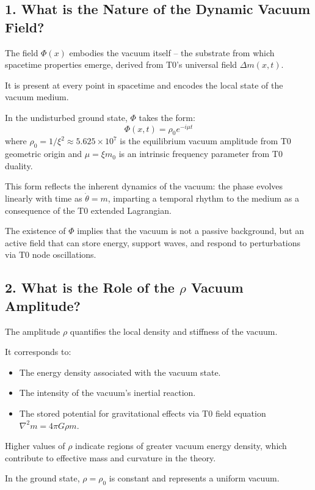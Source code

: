 \documentclass[12pt,a4paper]{article}
\begin{document}
	\subsection{1. What is the Nature of the Dynamic Vacuum Field?}
	
	The field $\Phi(x)$ embodies the vacuum itself – the substrate from which spacetime properties emerge, derived from T0's universal field $\Delta m(x,t)$.
	
	It is present at every point in spacetime and encodes the local state of the vacuum medium.
	
	In the undisturbed ground state, $\Phi$ takes the form:
	\[
	\Phi(x, t)= \rho_0 e^{-i\mu t}
	\]
	where $\rho_0 = 1/\xi^2 \approx 5.625 \times 10^7$ is the equilibrium vacuum amplitude from T0 geometric origin and $\mu = \xi m_0$ is an intrinsic frequency parameter from T0 duality.
	
	This form reflects the inherent dynamics of the vacuum: the phase evolves linearly with time as $\dot{\theta} = m$, imparting a temporal rhythm to the medium as a consequence of the T0 extended Lagrangian.
	
	The existence of $\Phi$ implies that the vacuum is not a passive background, but an active field that can store energy, support waves, and respond to perturbations via T0 node oscillations.
	
	\subsection{2. What is the Role of the $\rho$ Vacuum Amplitude?}
	
	The amplitude $\rho$ quantifies the local density and stiffness of the vacuum.
	
	It corresponds to:
	\begin{itemize}
		\item The energy density associated with the vacuum state.
		\item The intensity of the vacuum's inertial reaction.
		\item The stored potential for gravitational effects via T0 field equation $\nabla^2 m = 4\pi G \rho m$.
	\end{itemize}
	
	Higher values of $\rho$ indicate regions of greater vacuum energy density, which contribute to effective mass and curvature in the theory.
	
	In the ground state, $\rho = \rho_0$ is constant and represents a uniform vacuum.
	
\end{document}
